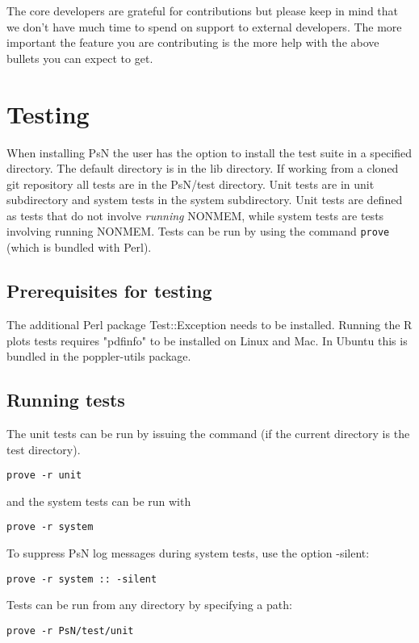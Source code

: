 The core developers are grateful for contributions but please keep in mind that we don't have much time to spend on support to external developers.
The more important the feature you are contributing is the more help with the above bullets you can expect to get.


\section{Testing}
When installing PsN the user has the option to install the test suite in a specified directory. The default directory is in the lib directory. If working from a cloned git repository all tests are in the PsN/test directory. Unit tests are in unit subdirectory and system tests in the system subdirectory.  
Unit tests are defined as tests that do not involve \emph{running} NONMEM, while system tests are tests involving running NONMEM.
Tests can be run by using the command \verb|prove| (which is bundled with Perl). 

\subsection{Prerequisites for testing}
The additional Perl package Test::Exception needs to be installed.
Running the R plots tests requires "pdfinfo" to be installed on Linux and Mac. In Ubuntu this is bundled in the poppler-utils package.

\subsection{Running tests}
The unit tests can be run by issuing the command (if the current directory is the test directory).
\begin{verbatim}
prove -r unit
\end{verbatim}

and the system tests can be run with
\begin{verbatim}
prove -r system
\end{verbatim}

To suppress PsN log messages during system tests, use the option -silent:
\begin{verbatim}
prove -r system :: -silent
\end{verbatim}

Tests can be run from any directory by specifying a path:
\begin{verbatim}
prove -r PsN/test/unit
\end{verbatim}

